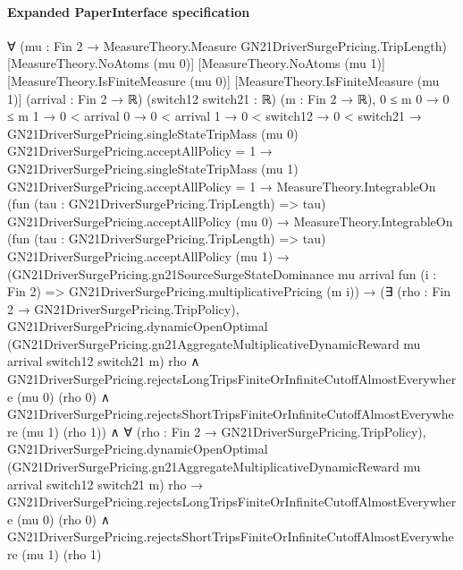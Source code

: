 \documentclass[10pt]{article}
\begin{document}
\paragraph{Expanded PaperInterface specification}
\begin{ReviewVerbatim}
∀ (mu : Fin 2 → MeasureTheory.Measure GN21DriverSurgePricing.TripLength) [MeasureTheory.NoAtoms (mu 0)]
  [MeasureTheory.NoAtoms (mu 1)] [MeasureTheory.IsFiniteMeasure (mu 0)] [MeasureTheory.IsFiniteMeasure (mu 1)]
  (arrival : Fin 2 → ℝ) (switch12 switch21 : ℝ) (m : Fin 2 → ℝ),
  0 ≤ m 0 →
    0 ≤ m 1 →
      0 < arrival 0 →
        0 < arrival 1 →
          0 < switch12 →
            0 < switch21 →
              GN21DriverSurgePricing.singleStateTripMass (mu 0) GN21DriverSurgePricing.acceptAllPolicy = 1 →
                GN21DriverSurgePricing.singleStateTripMass (mu 1) GN21DriverSurgePricing.acceptAllPolicy = 1 →
                  MeasureTheory.IntegrableOn (fun (tau : GN21DriverSurgePricing.TripLength) => tau)
                      GN21DriverSurgePricing.acceptAllPolicy (mu 0) →
                    MeasureTheory.IntegrableOn (fun (tau : GN21DriverSurgePricing.TripLength) => tau)
                        GN21DriverSurgePricing.acceptAllPolicy (mu 1) →
                      (GN21DriverSurgePricing.gn21SourceSurgeStateDominance mu arrival fun (i : Fin 2) =>
                          GN21DriverSurgePricing.multiplicativePricing (m i)) →
                        (∃ (rho : Fin 2 → GN21DriverSurgePricing.TripPolicy),
                            GN21DriverSurgePricing.dynamicOpenOptimal
                                (GN21DriverSurgePricing.gn21AggregateMultiplicativeDynamicReward mu arrival switch12
                                  switch21 m)
                                rho ∧
                              GN21DriverSurgePricing.rejectsLongTripsFiniteOrInfiniteCutoffAlmostEverywhere (mu 0)
                                  (rho 0) ∧
                                GN21DriverSurgePricing.rejectsShortTripsFiniteOrInfiniteCutoffAlmostEverywhere (mu 1)
                                  (rho 1)) ∧
                          ∀ (rho : Fin 2 → GN21DriverSurgePricing.TripPolicy),
                            GN21DriverSurgePricing.dynamicOpenOptimal
                                (GN21DriverSurgePricing.gn21AggregateMultiplicativeDynamicReward mu arrival switch12
                                  switch21 m)
                                rho →
                              GN21DriverSurgePricing.rejectsLongTripsFiniteOrInfiniteCutoffAlmostEverywhere (mu 0)
                                  (rho 0) ∧
                                GN21DriverSurgePricing.rejectsShortTripsFiniteOrInfiniteCutoffAlmostEverywhere (mu 1)
                                  (rho 1)
\end{ReviewVerbatim}
\end{document}
